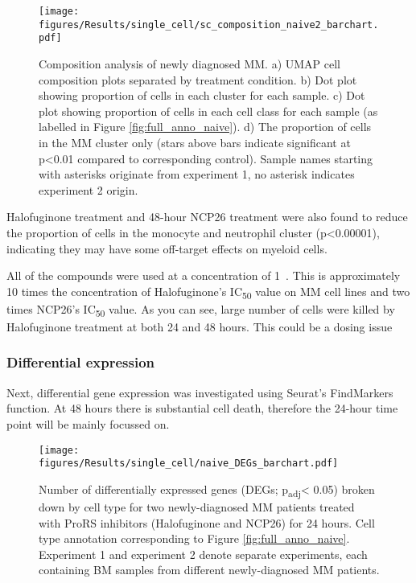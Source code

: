 \begin{figure}[htb]
\centering
\texttt{[image: figures/Results/single\_cell/sc\_composition\_naive2\_barchart.pdf]}
\caption[scRNA-seq composition analysis- newly diagnosed MM]{Composition analysis of newly diagnosed MM.
    a) UMAP cell composition plots separated by treatment condition.
    b) Dot plot showing proportion of cells in each cluster for each sample.
    c) Dot plot showing proportion of cells in each cell class for each sample (as labelled in Figure \ref{fig:full_anno_naive}).
    d) The proportion of cells in the MM cluster only (stars above bars indicate significant at p<0.01 compared to corresponding control).
    Sample names starting with asterisks originate from experiment 1, no asterisk indicates experiment 2 origin.}
\label{fig:composition_naive}
\end{figure}

Halofuginone treatment and 48-hour NCP26 treatment were also found to reduce the proportion of cells in the monocyte and neutrophil cluster (p<0.00001), indicating they may have some off-target effects on myeloid cells.

All of the compounds were used at a concentration of 1\si{\micro\Molar}.
This is approximately 10 times the concentration of Halofuginone's IC\textsubscript{50} value on MM cell lines and two times NCP26's IC\textsubscript{50} value.
As you can see, large number of cells were killed by Halofuginone treatment at both 24 and 48 hours.
This could be a dosing issue

\subsubsection{Differential expression}
Next, differential gene expression was investigated using Seurat's FindMarkers function.
At 48 hours there is substantial cell death, therefore the 24-hour time point will be mainly focussed on.
%
\begin{figure}[htb]
\centering
\texttt{[image: figures/Results/single\_cell/naive\_DEGs\_barchart.pdf]}
\caption[scRNA-seq DEGs per cell type- newly-diagnosed MM]{Number of differentially expressed genes (DEGs; p\textsubscript{adj}< 0.05) broken down by cell type for two newly-diagnosed MM patients treated with ProRS inhibitors (Halofuginone and NCP26) for 24 hours.
Cell type annotation corresponding to Figure \ref{fig:full_anno_naive}.
Experiment 1 and experiment 2 denote separate experiments, each containing BM samples from different newly-diagnosed MM patients.}
\label{fig:naive_deg_bar}
\end{figure}


